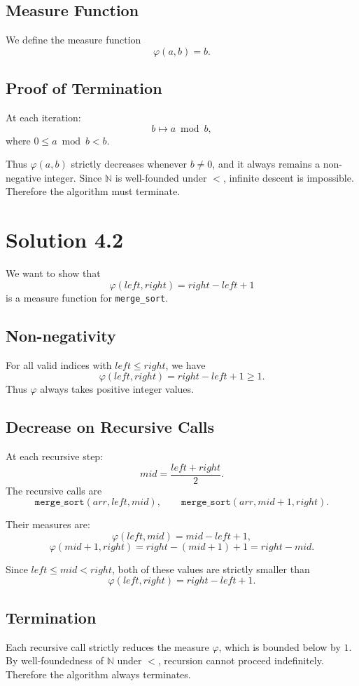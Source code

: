 \documentclass[12pt]{article}
\begin{document}
\subsection*{Measure Function}
We define the measure function
\[
    \varphi(a,b) = b.
\]

\subsection*{Proof of Termination}
At each iteration:
\[
    b \longmapsto a \bmod b,
\]
where $0 \leq a \bmod b < b$.

Thus $\varphi(a,b)$ strictly decreases whenever $b \neq 0$, and it always remains a non-negative integer. Since $\mathbb{N}$ is well-founded under $<$, infinite descent is impossible. Therefore the algorithm must terminate.

\bigskip

\section*{Solution 4.2}

We want to show that
\[
    \varphi(left, right) = right - left + 1
\]
is a measure function for \texttt{merge\_sort}.

\subsection*{Non-negativity}
For all valid indices with $left \leq right$, we have
\[
    \varphi(left, right) = right - left + 1 \geq 1.
\]
Thus $\varphi$ always takes positive integer values.

\subsection*{Decrease on Recursive Calls}
At each recursive step:
\[
    mid = \frac{left + right}{2}.
\]
The recursive calls are
\[
    \texttt{merge\_sort}(arr, left, mid), \qquad \texttt{merge\_sort}(arr, mid+1, right).
\]

Their measures are:
\[
    \varphi(left, mid) = mid - left + 1,
\]
\[
    \varphi(mid+1, right) = right - (mid+1) + 1 = right - mid.
\]

Since $left \leq mid < right$, both of these values are strictly smaller than
\[
    \varphi(left, right) = right - left + 1.
\]

\subsection*{Termination}
Each recursive call strictly reduces the measure $\varphi$, which is bounded below by $1$. By well-foundedness of $\mathbb{N}$ under $<$, recursion cannot proceed indefinitely. Therefore the algorithm always terminates.
\end{document}
